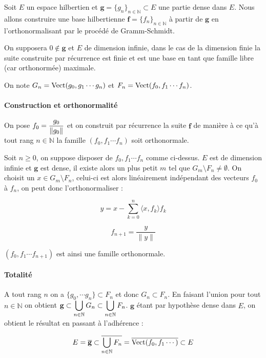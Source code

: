 	\begin{myproof}
		Soit $E$ un espace hilbertien et $\mathbf{g} = \{g_n\}_{n \in \mathbb{N}} \subset E$ une partie dense dans $E$. Nous allons construire une base hilbertienne $\mathbf{f} = \{f_n\}_{n \in \mathbb{N}}$ à partir de $\mathbf{g}$ en l'orthonormalisant par le procédé de Gramm-Schmidt.
		
		On supposera $0 \notin \mathbf{g}$ et $E$ de dimension infinie, dans le cas de la dimension finie la suite construite par récurrence est finie et est une base en tant que famille libre (car orthonormée) maximale.
		
		
		On note $G_n = \text{Vect} (g_0, g_1 \cdots g_n)$ et $F_n = \text{Vect} (f_0, f_1 \cdots f_n)$.
		
		\paragraph{Construction et orthonormalité}
		
		On pose $\displaystyle f_0 = \frac{g_0}{\|g_0\|}$ et on construit par récurrence la suite $\mathbf{f}$ de manière à ce qu'à tout rang $n \in \mathbb{N}$ la famille $(f_0, f_1 \cdots f_n)$ soit orthonormale.
		
		Soit $n \geqslant 0$, on suppose disposer de $f_0, f_1 \cdots f_n$ comme ci-dessus. $E$ est de dimension infinie et $\mathbf{g}$ est dense, il existe alors un plus petit $m$ tel que $G_m \setminus F_n \neq \emptyset$. On choisit un $x \in G_m \setminus F_n$, celui-ci est alors linéairement indépendant des vecteurs $f_0$ à $f_n$, on peut donc  l'orthonormaliser :
		
		$$y = x - \sum_{k = 0}^{n} \langle x, f_k \rangle f_k$$
		
		$$f_{n+1} = \frac{y}{\|y\|}$$
		
		$(f_0, f_1 \cdots f_{n+1})$ est ainsi une famille orthonormale.
		
		\paragraph{Totalité}
		
		A tout rang $n$ on a $\{g_0, \cdots g_n\} \subset F_n$ et donc $G_n \subset F_n$. En faisant l'union pour tout $n \in \mathbb{N}$ on obtient $\displaystyle \mathbf{g} \subset \bigcup_{n \in \mathbb{N}} G_n \subset \bigcup_{n \in \mathbb{N}} F_n$. $\mathbf{g}$ étant par hypothèse dense dans $E$, on obtient le résultat en passant à l'adhérence :
		
		$$E = \overline{\mathbf{g}} \subset \overline{\bigcup_{n \in \mathbb{N}} F_n} = \overline{\text{Vect} (f_0, f_1 \cdots)} \subset E$$
		\cqfd
	\end{myproof}
	
